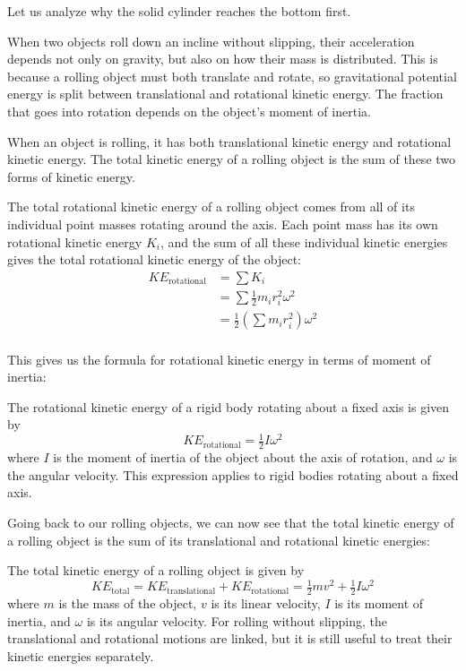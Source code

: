 Let us analyze why the solid cylinder reaches the bottom first.

When two objects roll down an incline without slipping, their acceleration depends not only on gravity, but also on how their mass is distributed. This is because a rolling object must both translate and rotate, so gravitational potential energy is split between translational and rotational kinetic energy. The fraction that goes into rotation depends on the object's moment of inertia.

When an object is rolling, it has both translational kinetic energy and rotational kinetic energy. The total kinetic energy of a rolling object is the sum of these two forms of kinetic energy.

The total rotational kinetic energy of a rolling object comes from all of its individual point masses rotating around the axis. Each point mass has its own rotational kinetic energy $K_i$, and the sum of all these individual kinetic energies gives the total rotational kinetic energy of the object:
\begin{align*}
KE_{\text{rotational}}
&= \sum K_i \\
&= \sum \tfrac{1}{2} m_i r_i^2 \omega^2 \\
&= \tfrac{1}{2} \left( \sum m_i r_i^2 \right) \omega^2 \\
\end{align*}

This gives us the formula for rotational kinetic energy in terms of moment of inertia:
\begin{mdframed}[frametitle = {Rotational Kinetic Energy}, style = important]
The rotational kinetic energy of a rigid body rotating about a fixed axis is given by
\begin{equation}
  KE_{\text{rotational}} = \tfrac{1}{2} I \omega^2
\label{eq:rotKE}
\end{equation}
where $I$ is the moment of inertia of the object about the axis of rotation, and $\omega$ is the angular velocity. This expression applies to rigid bodies rotating about a fixed axis.
\end{mdframed}

Going back to our rolling objects, we can now see that the total kinetic energy of a rolling object is the sum of its translational and rotational kinetic energies:
\begin{mdframed}[frametitle = {Total Kinetic Energy of a Rolling Object}, style = important]
The total kinetic energy of a rolling object is given by
\begin{equation}
  KE_{\text{total}} = KE_{\text{translational}} + KE_{\text{rotational}} = \tfrac{1}{2} mv^2 + \tfrac{1}{2} I \omega^2
\label{eq:totalKErolling}
\end{equation}
where $m$ is the mass of the object, $v$ is its linear velocity, $I$ is its moment of inertia, and $\omega$ is its angular velocity. For rolling without slipping, the translational and rotational motions are linked, but it is still useful to treat their kinetic energies separately.
\end{mdframed}

